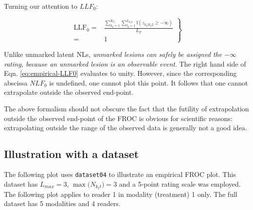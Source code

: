 \documentclass[
]{book}
\newenvironment{Shaded}{\begin{snugshade}}{\end{snugshade}}
\newcommand{\AttributeTok}[1]{\textcolor[rgb]{0.77,0.63,0.00}{#1}}
\newcommand{\DecValTok}[1]{\textcolor[rgb]{0.00,0.00,0.81}{#1}}
\newcommand{\FunctionTok}[1]{\textcolor[rgb]{0.00,0.00,0.00}{#1}}
\newcommand{\NormalTok}[1]{#1}
\newcommand{\OtherTok}[1]{\textcolor[rgb]{0.56,0.35,0.01}{#1}}
\newcommand{\SpecialCharTok}[1]{\textcolor[rgb]{0.00,0.00,0.00}{#1}}
\newcommand{\StringTok}[1]{\textcolor[rgb]{0.31,0.60,0.02}{#1}}
\begin{document}
Turning our attention to \(LLF_0\):

\begin{equation}
\left.
\begin{aligned}
\text{LLF}_0 =& \frac{ \sum_{k_2=1}^{K_2} \sum_{l_2=1}^{L_{k_2 2}} \mathbb{I} \left ( z_{k_2 2 l_2 2} \geq  -\infty  \right ) }{L_T}\\
=& 1
\end{aligned}
\right \}
\label{eq:empirical-LLF0}
\end{equation}

Unlike unmarked latent NLs, \emph{unmarked lesions can safely be assigned the \(-\infty\) rating, because an unmarked lesion is an observable event}. The right hand side of Eqn. \eqref{eq:empirical-LLF0} evaluates to unity. However, since the corresponding abscissa \(NLF_0\) is undefined, one cannot plot this point. It follows that one cannot extrapolate outside the observed end-point.

The above formalism should not obscure the fact that the futility of extrapolation outside the observed end-point of the FROC is obvious for scientific reasons: extrapolating outside the range of the observed data is generally not a good idea.

\hypertarget{empirical-froc-plot-illustration}{%
\subsection{Illustration with a dataset}\label{empirical-froc-plot-illustration}}

The following plot uses \texttt{dataset04} \citep{zanca2009evaluation} to illustrate an empirical FROC plot. This dataset has \(L_{max} = 3\), \(\max{(N_{k_tt}})= 3\) and a 5-point rating scale was employed. The following plot applies to reader 1 in modality (treatment) 1 only. The full dataset has 5 modalities and 4 readers.

\begin{Shaded}
\end{Shaded}
\end{document}

